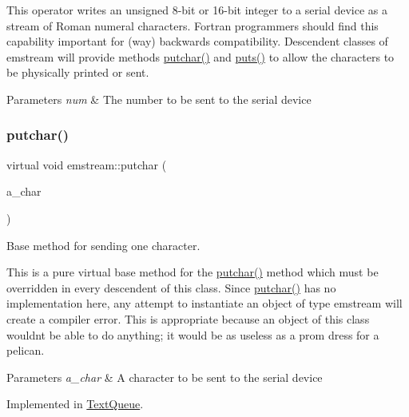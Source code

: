 This operator writes an unsigned 8-\/bit or 16-\/bit integer to a serial device as a stream of Roman numeral characters. Fortran programmers should find this capability important for (way) backwards compatibility. Descendent classes of {\ttfamily emstream} will provide methods {\ttfamily \mbox{\hyperlink{classemstream_aa4dffc9aa58f601cc4153b4cbe65d757}{putchar()}}} and {\ttfamily \mbox{\hyperlink{classemstream_a1ad530cbebe6c54640c1db8c1b9afda2}{puts()}}} to allow the characters to be physically printed or sent. 
\begin{DoxyParams}{Parameters}
{\em num} & The number to be sent to the serial device \\
\hline
\end{DoxyParams}
\mbox{\label{classemstream_aa4dffc9aa58f601cc4153b4cbe65d757}} 
\subsubsection{\texorpdfstring{putchar()}{putchar()}}
{\footnotesize\ttfamily virtual void emstream\+::putchar (\begin{DoxyParamCaption}\item[{char}]{a\+\_\+char }\end{DoxyParamCaption})\hspace{0.3cm}{\ttfamily [pure virtual]}}



Base method for sending one character. 

This is a pure virtual base method for the {\ttfamily \mbox{\hyperlink{classemstream_aa4dffc9aa58f601cc4153b4cbe65d757}{putchar()}}} method which must be overridden in every descendent of this class. Since {\ttfamily \mbox{\hyperlink{classemstream_aa4dffc9aa58f601cc4153b4cbe65d757}{putchar()}}} has no implementation here, any attempt to instantiate an object of type {\ttfamily emstream} will create a compiler error. This is appropriate because an object of this class wouldn\textquotesingle{}t be able to do anything; it would be as useless as a prom dress for a pelican. 
\begin{DoxyParams}{Parameters}
{\em a\+\_\+char} & A character to be sent to the serial device \\
\hline
\end{DoxyParams}


Implemented in \mbox{\hyperlink{class_text_queue_a917e1c134d4ef6591f832e2706a67cac}{Text\+Queue}}.

